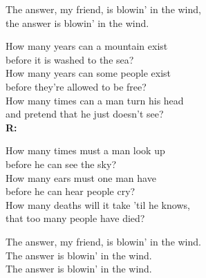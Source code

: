 {{\chorus{}The \noprint{\G{}}answer, my \noprint{\A{}}friend, is \noprint{\D{}}blowin' in the \noprint{\Hm{}}wind,\\
the \noprint{\G{}}answer is \noprint{\A[7]{}}blowin' in the \noprint{\D{}}wind.

How many years can a mountain exist\\
before it is washed to the sea?\\
How many years can some people exist\\
before they're allowed to be free?\\
How many times can a man turn his head\\
and pretend that he just doesn't see?\\
\textbf{R:}

How many times must a man look up\\
before he can see the sky?\\
How many ears must one man have\\
before he can hear people cry?\\
How many deaths will it take 'til he knows,\\
that too many people have died?

\chorus{}The answer, my friend, is blowin' in the wind.\\
The answer is blowin' in the wind.\\
The answer is blowin' in the wind.\\ 
}
}





